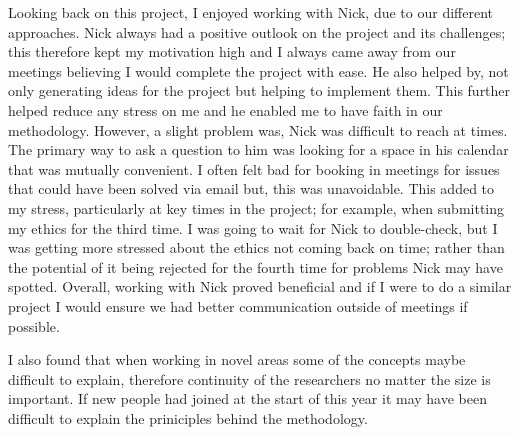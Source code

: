 Looking back on this project, I enjoyed working with Nick, due to our different approaches. Nick always had a positive outlook on the project and its challenges; this therefore kept my motivation high and I always came away from our meetings believing I would complete the project with ease. He also helped by, not only generating ideas for the project but helping to implement them. This further helped reduce any stress on me and he enabled me to have faith in our methodology. However, a slight problem was, Nick was difficult to reach at times. The primary way to ask a question to him was looking for a space in his calendar that was mutually convenient. I often felt bad for booking in meetings for issues that could have been solved via email but, this was unavoidable. This added to my stress, particularly at key times in the project; for example, when submitting my ethics for the third time. I was going to wait for Nick to double-check, but I was getting more stressed about the ethics not coming back on time; rather than the potential of it being rejected for the fourth time for problems Nick may have spotted. Overall, working with Nick proved beneficial and if I were to do a similar project I would ensure we had better communication outside of meetings if possible.

I also found that when working in novel areas some of the concepts maybe difficult to explain, therefore continuity of the researchers no matter the size is important. If new people had joined at the start of this year it may have been difficult to explain the priniciples behind the methodology. 




